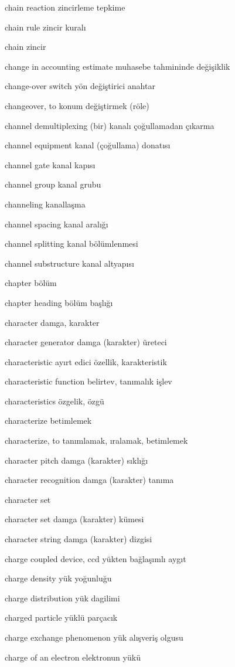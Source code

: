 \documentclass[12pt,fleqn]{article}\usepackage{../../common}
\begin{document}
chain reaction zincirleme tepkime

chain rule zincir kuralı

chain zincir

change in accounting estimate muhasebe tahmininde değişiklik

change-over switch yön değiştirici anahtar

changeover, to konum değiştirmek (röle)

channel demultiplexing (bir) kanalı çoğullamadan çıkarma

channel equipment kanal (çoğullama) donatısı

channel gate kanal kapısı

channel group kanal grubu

channeling kanallaşma

channel spacing kanal aralığı

channel splitting kanal bölümlenmesi

channel substructure kanal altyapısı

chapter bölüm

chapter heading bölüm başlığı

character damga, karakter

character generator damga (karakter) üreteci

characteristic ayırt edici özellik, karakteristik

characteristic function belirtev, tanımalık işlev

characteristics özgelik, özgü

characterize betimlemek

characterize, to tanımlamak, ıralamak, betimlemek

character pitch damga (karakter) sıklığı

character recognition damga (karakter) tanıma

character set

character set damga (karakter) kümesi

character string damga (karakter) dizgisi

charge coupled device, ccd yükten bağlaşımlı aygıt

charge density yük yoğunluğu

charge distribution yük dagilimi

charged particle yüklü parçacık

charge exchange phenomenon yük alışveriş olgusu

charge of an electron elektronun yükü
\end{document}
